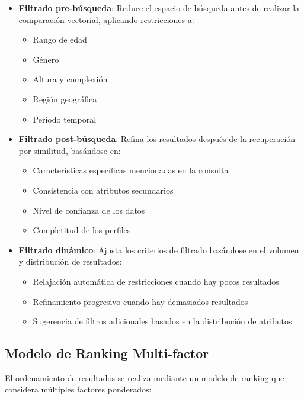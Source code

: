 \documentclass[12pt,a4paper]{article}
\begin{document}
\begin{itemize}
    \item \textbf{Filtrado pre-búsqueda}: Reduce el espacio de búsqueda antes de realizar la comparación vectorial, aplicando restricciones a:
    \begin{itemize}
        \item Rango de edad
        \item Género
        \item Altura y complexión
        \item Región geográfica
        \item Período temporal
    \end{itemize}
    
    \item \textbf{Filtrado post-búsqueda}: Refina los resultados después de la recuperación por similitud, basándose en:
    \begin{itemize}
        \item Características específicas mencionadas en la consulta
        \item Consistencia con atributos secundarios
        \item Nivel de confianza de los datos
        \item Completitud de los perfiles
    \end{itemize}
    
    \item \textbf{Filtrado dinámico}: Ajusta los criterios de filtrado basándose en el volumen y distribución de resultados:
    \begin{itemize}
        \item Relajación automática de restricciones cuando hay pocos resultados
        \item Refinamiento progresivo cuando hay demasiados resultados
        \item Sugerencia de filtros adicionales basados en la distribución de atributos
    \end{itemize}
\end{itemize}

\subsection{Modelo de Ranking Multi-factor}
\label{subsec:ss-ranking}

El ordenamiento de resultados se realiza mediante un modelo de ranking que considera múltiples factores ponderados:
\end{document}
